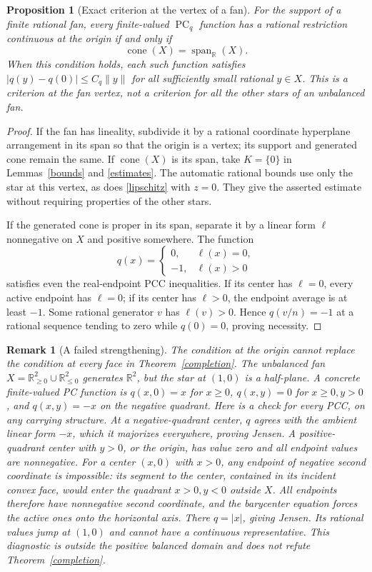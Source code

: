 \documentclass[11pt]{article}
\newtheorem{proposition}[theorem]{Proposition}
\newtheorem{remark}[theorem]{Remark}
\newcommand{\R}{\mathbb R}
\newcommand{\PC}{\operatorname{PC}}
\newcommand{\cone}{\operatorname{cone}}
\newcommand{\spanR}{\operatorname{span}_{\R}}
\begin{document}
\begin{proposition}[Exact criterion at the vertex of a fan]\label{fancriterion}
For the support of a finite rational fan, every finite-valued $\PC_q$ function has a rational restriction continuous at the origin if and only if
\[\cone(X)=\spanR(X).
\]
When this condition holds, each such function satisfies $|q(y)-q(0)|\leq C_q\|y\|$ for all sufficiently small rational $y\in X$. This is a criterion at the fan vertex, not a criterion for all the other stars of an unbalanced fan.
\end{proposition}
\begin{proof}
If the fan has lineality, subdivide it by a rational coordinate hyperplane arrangement in its span so that the origin is a vertex; its support and generated cone remain the same. If $\cone(X)$ is its span, take $K=\{0\}$ in Lemmas~\ref{bounds} and \ref{estimates}. The automatic rational bounds use only the star at this vertex, as does \eqref{lipschitz} with $z=0$. They give the asserted estimate without requiring properties of the other stars.

If the generated cone is proper in its span, separate it by a linear form $\ell$ nonnegative on $X$ and positive somewhere. The function
\[q(x)=\begin{cases}0,&\ell(x)=0,\\-1,&\ell(x)>0\end{cases}\]
satisfies even the real-endpoint PCC inequalities. If its center has $\ell=0$, every active endpoint has $\ell=0$; if its center has $\ell>0$, the endpoint average is at least $-1$. Some rational generator $v$ has $\ell(v)>0$. Hence $q(v/n)=-1$ at a rational sequence tending to zero while $q(0)=0$, proving necessity.
\end{proof}

\begin{remark}[A failed strengthening]\label{failed-fan}
The condition at the origin cannot replace the condition at every face in Theorem~\ref{completion}. The unbalanced fan $X=\R_{\geq0}^2\cup\R_{\leq0}^2$ generates $\R^2$, but the star at $(1,0)$ is a half-plane. A concrete finite-valued PC function is $q(x,0)=x$ for $x\geq0$, $q(x,y)=0$ for $x\geq0,y>0$, and $q(x,y)=-x$ on the negative quadrant. Here is a check for every PCC, on any carrying structure. At a negative-quadrant center, $q$ agrees with the ambient linear form $-x$, which it majorizes everywhere, proving Jensen. A positive-quadrant center with $y>0$, or the origin, has value zero and all endpoint values are nonnegative. For a center $(x,0)$ with $x>0$, any endpoint of negative second coordinate is impossible: its segment to the center, contained in its incident convex face, would enter the quadrant $x>0,y<0$ outside $X$. All endpoints therefore have nonnegative second coordinate, and the barycenter equation forces the active ones onto the horizontal axis. There $q=|x|$, giving Jensen. Its rational values jump at $(1,0)$ and cannot have a continuous representative. This diagnostic is outside the positive balanced domain and does not refute Theorem~\ref{completion}.
\end{remark}
\end{document}
